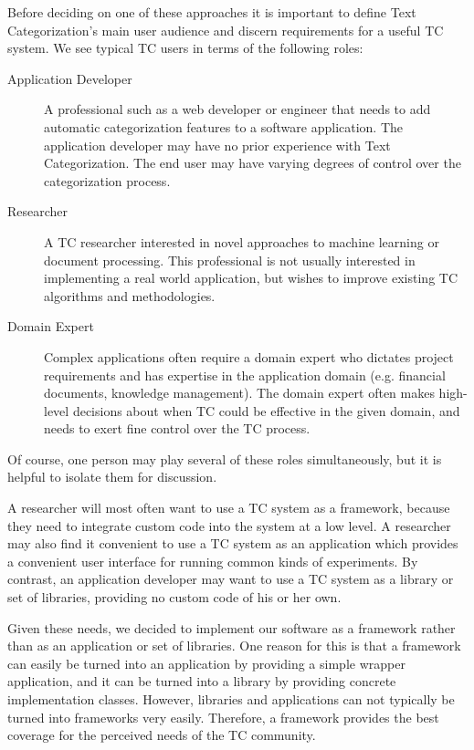 \documentclass[a4paper,twocolumn]{article}
\begin{document}
Before deciding on one of these approaches it is important to define Text Categorization's main user audience and discern requirements for a useful TC system.  We see typical TC users in terms of the following roles:

\begin{description}
\item[Application Developer] A professional such as a web developer or engineer that needs to add automatic categorization features to a software application. The application developer may have no prior experience with Text Categorization.  The end user may have varying degrees of control over the categorization process.

\item[Researcher] A TC researcher interested in novel approaches to machine learning or document processing.  This professional is not usually interested in implementing a real world application, but wishes to improve existing TC algorithms and methodologies.

\item[Domain Expert] Complex applications often require a domain expert who dictates project requirements and has expertise in the application domain (e.g. financial documents, knowledge management).  The domain expert often makes high-level decisions about when TC could be effective in the given domain, and needs to exert fine control over the TC process.
\end{description}

Of course, one person may play several of these roles simultaneously, but it is helpful to isolate them for discussion.

A researcher will most often want to use a TC system as a framework, because they need to integrate custom code into the system at a low level.  A researcher may also find it convenient to use a TC system as an application which provides a convenient user interface for running common kinds of experiments.  By contrast, an application developer may want to use a TC system as a library or set of libraries, providing no custom code of his or her own.

Given these needs, we decided to implement our software as a framework rather than as an application or set of libraries.  One reason for this is that a framework can easily be turned into an application by providing a simple wrapper application, and it can be turned into a library by providing concrete implementation classes.  However, libraries and applications can not typically be turned into frameworks very easily.  Therefore, a framework provides the best coverage for the perceived needs of the TC community.
\end{document}
